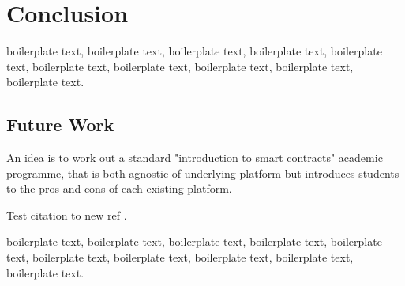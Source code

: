 \chapter{Conclusion}


boilerplate text, boilerplate text, boilerplate text, boilerplate text, boilerplate text, boilerplate text, boilerplate text, boilerplate text, boilerplate text, boilerplate text.


\section{Future Work}


An idea is to work out a standard "introduction to smart contracts" academic programme, that is both agnostic of underlying platform but introduces students to the pros and cons of each existing platform.

Test citation to new ref  \cite{dekkerCollectingConservingNet2018}.

boilerplate text, boilerplate text, boilerplate text, boilerplate text, boilerplate text, boilerplate text, boilerplate text, boilerplate text, boilerplate text, boilerplate text.